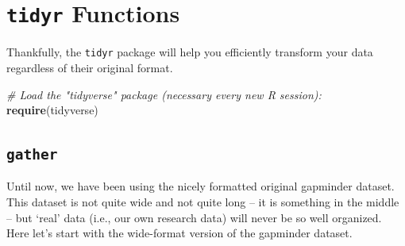 \documentclass[]{book}
\newenvironment{Shaded}{\begin{snugshade}}{\end{snugshade}}
\newcommand{\KeywordTok}[1]{\textcolor[rgb]{0.13,0.29,0.53}{\textbf{#1}}}
\newcommand{\CommentTok}[1]{\textcolor[rgb]{0.56,0.35,0.01}{\textit{#1}}}
\newcommand{\NormalTok}[1]{#1}
\begin{document}
\section{\texorpdfstring{\texttt{tidyr}
Functions}{tidyr Functions}}\label{tidyr-functions}

Thankfully, the \texttt{tidyr} package will help you efficiently
transform your data regardless of their original format.

\begin{Shaded}
\begin{Highlighting}[]
\CommentTok{# Load the "tidyverse" package (necessary every new R session):}
\KeywordTok{require}\NormalTok{(tidyverse)}
\end{Highlighting}
\end{Shaded}

\subsection{\texorpdfstring{\texttt{gather}}{gather}}\label{gather}

Until now, we have been using the nicely formatted original gapminder
dataset. This dataset is not quite wide and not quite long -- it is
something in the middle -- but `real' data (i.e., our own research data)
will never be so well organized. Here let's start with the wide-format
version of the gapminder dataset.
\end{document}
